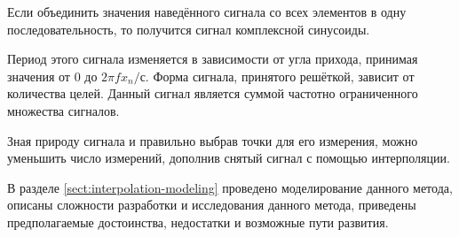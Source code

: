Если объединить значения наведённого сигнала со всех элементов в одну последовательность, 
то получится сигнал комплексной синусоиды.

Период этого сигнала изменяется в зависимости от угла прихода, принимая значения от $0$ до $2\pi fx_n/с$.
Форма сигнала, принятого решёткой, зависит от количества целей. Данный сигнал является суммой частотно ограниченного множества сигналов. 

Зная природу сигнала и правильно выбрав точки для его измерения, можно уменьшить число измерений, 
дополнив снятый сигнал с помощью интерполяции.

В разделе \ref{sect:interpolation-modeling} проведено моделирование данного метода, 
описаны сложности разработки и исследования данного метода, приведены предполагаемые достоинства, 
недостатки и возможные пути развития.

